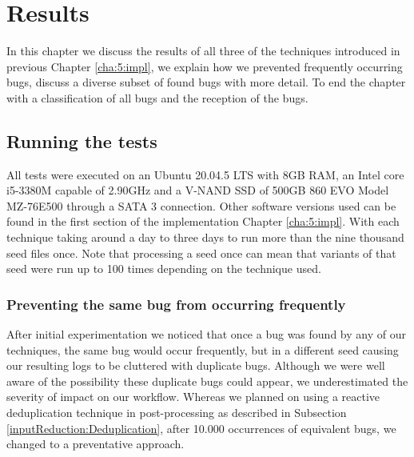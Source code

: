 \chapter{Results}
\label{cha:6:res}
\label{res:Intro}
In this chapter we discuss the results of all three of the techniques introduced in previous Chapter \ref{cha:5:impl}, we explain how we prevented frequently occurring bugs, discuss a diverse subset of found bugs with more detail. To end the chapter with a classification of all bugs and the reception of the bugs.


\section{Running the tests}
\label{res:RunningTests}
\label{res:Specs}
All tests were executed on an Ubuntu 20.04.5 LTS with 8GB RAM, an Intel core i5-3380M capable of 2.90GHz and a V-NAND SSD of 500GB 860 EVO Model MZ-76E500 through a SATA 3 connection. Other software versions used can be found in the first section of the implementation Chapter \ref{cha:5:impl}. With each technique taking around a day to three days to run more than the nine thousand seed files once. Note that processing a seed once can mean that variants of that seed were run up to 100 times depending on the technique used.


\subsection{Preventing the same bug from occurring frequently}
After initial experimentation we noticed that once a bug was found by any of our techniques, the same bug would occur frequently, but in a different seed causing our resulting logs to be cluttered with duplicate bugs. Although we were well aware of the possibility these duplicate bugs could appear, we underestimated the severity of impact on our workflow. Whereas we planned on using a reactive deduplication technique in post-processing as described in Subsection \ref{inputReduction:Deduplication}, after 10.000 occurrences of equivalent bugs, we changed to a preventative approach. 

